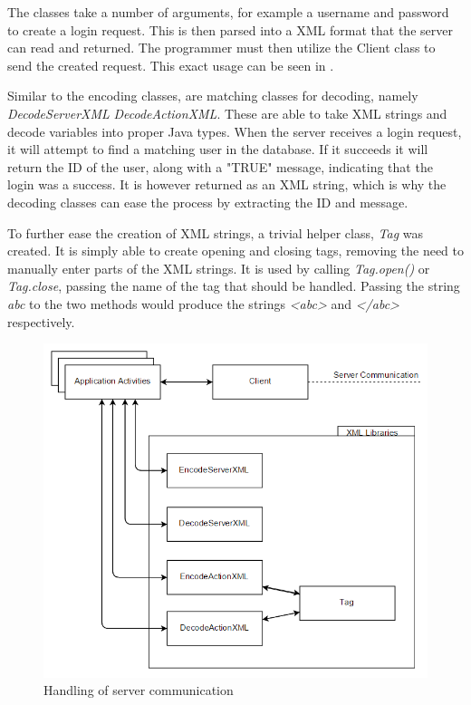 The classes take a number of arguments, for example a username and password to create a login request. This is then parsed into a XML format that the server can read and returned. The programmer must then utilize the Client class to send the created request. This exact usage can be seen in .

Similar to the encoding classes, are matching classes for decoding, namely \textit{DecodeServerXML} \textit{DecodeActionXML}. These are able to take XML strings and decode variables into proper Java types. When the server receives a login request, it will attempt to find a matching user in the database. If it succeeds it will return the ID of the user, along with a "TRUE" message, indicating that the login was a success. It is however returned as an XML string, which is why the decoding classes can ease the process by extracting the ID and message.

To further ease the creation of XML strings, a trivial helper class, \textit{Tag} was created. It is simply able to create opening and closing tags, removing the need to manually enter parts of the XML strings. It is used by calling \textit{Tag.open()} or \textit{Tag.close}, passing the name of the tag that should be handled. Passing the string \textit{abc} to the two methods would produce the strings \textit{<abc>} and \textit{</abc>} respectively.

\begin{figure}[H]
\centering
\includegraphics[width=\textwidth]{billeder/appcommunication.png}
\caption{Handling of server communication}
\label{fig:appcommunication}
\end{figure}
